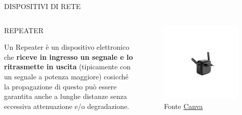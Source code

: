 \documentclass[aspectratio=1610]{beamer}
\begin{document}
\begin{frame}{DISPOSITIVI DI RETE}
    \begin{columns}
            \justifying
            \begin{alertblock}{REPEATER}
                \begin{minipage}{0.96\linewidth}
                    \justifying
                    Un Repeater è un dispositivo elettronico che \textbf{riceve in ingresso un 
                    segnale e lo ritrasmette in uscita} (tipicamente con un segnale a potenza maggiore) 
                    cosicché la propagazione di questo può essere garantita anche a lunghe 
                    distanze senza eccessiva attenuazione e/o degradazione.
                \end{minipage}
            \end{alertblock}
            \begin{figure}
                \includegraphics[width=\linewidth]{img/repeater.png}
                \caption{{Fonte \href{https://www.canva.com/}{Canva}}}
            \end{figure}
    \end{columns}
\end{frame}
\end{document}
